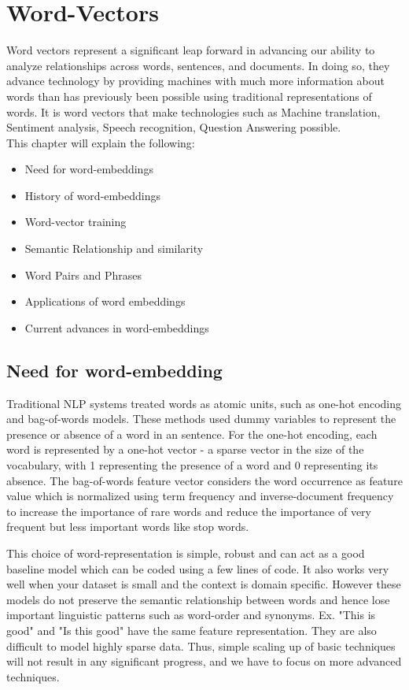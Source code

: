 \newpage
\section{Word-Vectors}

Word vectors represent a significant leap forward in advancing our ability to analyze relationships across words, sentences, and documents. In doing so, they advance technology by providing machines with much more information about words than has previously been possible using traditional representations of words. It is word vectors that make technologies such as Machine translation, Sentiment analysis, Speech recognition, Question Answering possible.\\

\noindent This chapter will explain the following:
\begin{itemize}
\item{Need for word-embeddings}
\item{History of word-embeddings}
\item{Word-vector training}
\item{Semantic Relationship and similarity}
\item{Word Pairs and Phrases}
\item{Applications of word embeddings}
\item{Current advances in word-embeddings}
\end{itemize}

\subsection{Need for word-embedding}

Traditional NLP systems treated words as atomic units, such as one-hot encoding and bag-of-words models. These methods used dummy variables to represent the presence or absence of a word in an sentence. For the one-hot encoding, each word is represented by a one-hot vector - a sparse vector in the size of the vocabulary, with 1 representing the presence of a word and 0 representing its absence. The bag-of-words feature vector considers the word occurrence as feature value which is normalized using term frequency and inverse-document frequency to increase the importance of rare words and reduce the importance of very frequent but less important words like stop words.

This choice of word-representation is simple, robust and can act as a good baseline model which can be coded using a few lines of code. It also works very well when your dataset is small and the context is domain specific. However these models do not preserve the semantic relationship between words and hence lose important linguistic patterns such as word-order and synonyms. Ex. "This is good" and "Is this good" have the same feature representation. They are also difficult to model highly sparse data. Thus, simple scaling up of basic techniques will not result in any significant progress, and we have to focus on more advanced techniques.


